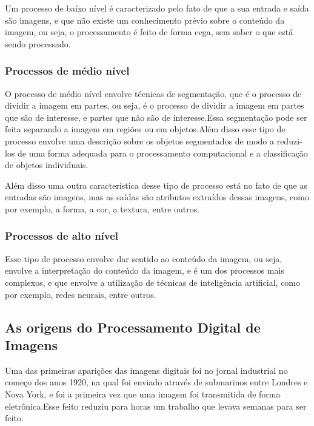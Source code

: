 \documentclass[12pt]{article}
\begin{document}
Um processo de baíxo nível é caracterizado pelo fato de que a sua entrada e saída são imagens, e que
não existe um conhecimento prévio sobre o conteúdo da imagem, ou seja, o processamento é feito de forma
cega, sem saber o que está sendo processado.

 \subsubsection[Processos de médio nível]{Processos de médio nível}

O processo de médio nível envolve técnicas de segmentação, que é o processo de dividir a imagem em
partes, ou seja, é o processo de dividir a imagem em partes que são de interesse, e partes que não são
de interesse.Essa segmentação pode ser feita separando a imagem em regiões ou em objetos.Além disso
esse tipo de processo envolve uma descrição sobre os objetos segmentados de modo a reduzi-los de uma
forma adequada para o processamento computacional e a classificação de objetos individuais.

Além disso uma outra característica desse tipo de processo está no fato de que as entradas são
imagens, mas as saídas são atributos extraídos dessas imagens, como por exemplo, a forma, a cor, a
textura, entre outros.

 \subsubsection[Processos de alto nível]{Processos de alto nível}

Esse tipo de processo envolve dar sentido ao conteúdo da imagem, ou seja, envolve a interpretação do
conteúdo da imagem, e é um dos processos mais complexos, e que envolve a utilização de técnicas de
inteligência artificial, como por exemplo, redes neurais, entre outros.

\subsection{As origens do Processamento Digital de Imagens}

Uma das primeiras aparições das imagens digitais foi no jornal industrial no começo dos anos 1920,
na qual foi enviado através de submarinos entre Londres e Nova York, e foi a primeira vez que uma
imagem foi transmitida de forma eletrônica.Esse feito reduziu para horas um trabalho que levava
semanas para ser feito.
\end{document}
